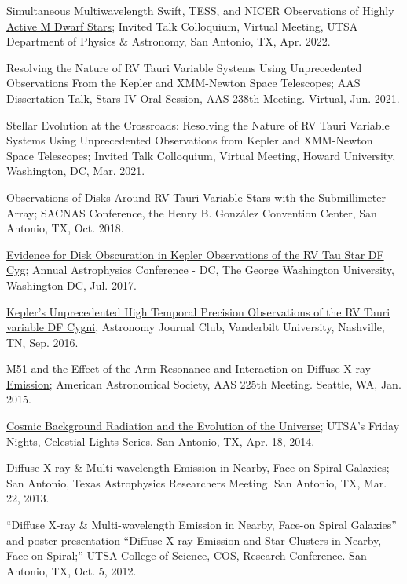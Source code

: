 \documentclass[12pt]{article}
\begin{document}
\begin{etaremune}
\item \href{https://twitter.com/UTSA_PhyAst/status/1508503792261779464?s=20&t=dVQ_0wPfIXmUPicaAi6VLg}{Simultaneous Multiwavelength Swift, TESS, and NICER Observations of Highly Active M Dwarf Stars}; Invited Talk Colloquium, Virtual Meeting, UTSA Department of Physics \& Astronomy, San Antonio, TX, Apr. 2022. 

\item Resolving the Nature of RV Tauri Variable Systems Using Unprecedented Observations From the Kepler and XMM-Newton Space Telescopes; AAS Dissertation Talk, Stars IV Oral Session, AAS 238th Meeting. Virtual, Jun. 2021.

\item Stellar Evolution at the Crossroads: Resolving the Nature of RV Tauri Variable Systems Using Unprecedented Observations from Kepler and XMM-Newton Space Telescopes; Invited Talk Colloquium, Virtual Meeting, Howard University, Washington, DC, Mar. 2021.

\item Observations of Disks Around RV Tauri Variable Stars with the Submillimeter Array; SACNAS Conference, the Henry B. Gonz\'alez Convention Center, San Antonio, TX, Oct. 2018.

\item \href{https://physics.columbian.gwu.edu/sites/g/files/zaxdzs1976/f/downloads/ACDC2017_Agenda_0.pdf}{Evidence for Disk Obscuration in Kepler Observations of the RV Tau Star DF Cyg};  Annual Astrophysics Conference - DC, The George Washington University, Washington DC, Jul. 2017.

\item \href{https://as.vanderbilt.edu/astronomy/2016/08/journal-club-fall-2016/}{Kepler's Unprecedented High Temporal Precision Observations of the RV Tauri variable DF Cygni}, Astronomy Journal Club, Vanderbilt University, Nashville, TN, Sep. 2016.

\item \href{http://adsabs.harvard.edu/abs/2015AAS...22522708V}{M51 and the Effect of the Arm Resonance and Interaction on Diffuse X-ray Emission}; American Astronomical Society, AAS 225th Meeting. Seattle, WA, Jan. 2015.

\item \href{http://www.utsa.edu/today/2014/04/celestiallights4.html}{Cosmic Background Radiation and the Evolution of the Universe}; UTSA’s Friday Nights, Celestial Lights Series. San Antonio, TX, Apr. 18, 2014.

\item Diffuse X-ray \& Multi-wavelength Emission in Nearby, Face-on Spiral Galaxies; San Antonio, Texas Astrophysics Researchers Meeting. San Antonio, TX, Mar. 22, 2013.

\item “Diffuse X-ray \& Multi-wavelength Emission in Nearby, Face-on Spiral Galaxies” and poster presentation “Diffuse X-ray Emission and Star Clusters in Nearby, Face-on Spiral;” UTSA College of Science, COS, Research Conference. San Antonio, TX, Oct. 5, 2012.

\end{etaremune}
\end{document}
